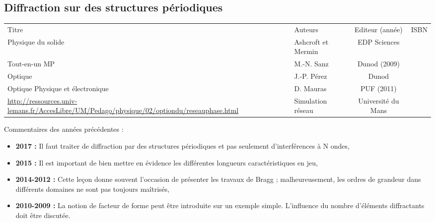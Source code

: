 \begin{headerBlock}
  \chapter{Diffraction sur des structures périodiques}
    \label{LP_DiffractionPeriodique}
\end{headerBlock}

\begin{center}
\begin{tabularx}{\textwidth}{| X | X | c | c |}
  \hline
  \rowcolor{gray!20}\multicolumn{4}{c}{Bibliographie de la leçon : } \\
  \hline 
  Titre & Auteurs & Editeur (année) & ISBN \\
  \hline
   Physique du solide & Ashcroft et Mermin & EDP Sciences &   \\
  \hline 
   Tout-en-un MP & M.-N. Sanz & Dunod (2009) &  \\
  \hline 
  Optique & J.-P. Pérez & Dunod & \\
  \hline 
  Optique Physique et électronique & D. Mauras & PUF (2011) & \\
  \hline
  \url{http://ressources.univ-lemans.fr/AccesLibre/UM/Pedago/physique/02/optiondu/reseauphase.html} & Simulation réseau & Université du Mans & \\
\end{tabularx}
\end{center}

\begin{reportBlock}{Commentaires des années précédentes :}
    \begin{itemize}
        \item \textbf{2017 :} Il faut traiter de diffraction par des structures périodiques et pas seulement d’interférences à N ondes,
        \item \textbf{2015 :} Il est important de bien mettre en évidence les différentes longueurs caractéristiques en jeu,
        \item \textbf{2014-2012 :} Cette leçon donne souvent l’occasion de présenter les travaux de Bragg ; malheureusement, les ordres de grandeur dans différents domaines ne sont pas toujours maîtrisés,
        \item \textbf{2010-2009 :} La notion de facteur de forme peut être introduite sur un exemple simple. L’influence du nombre d’éléments diffractants doit être discutée.
    \end{itemize}
\end{reportBlock}

